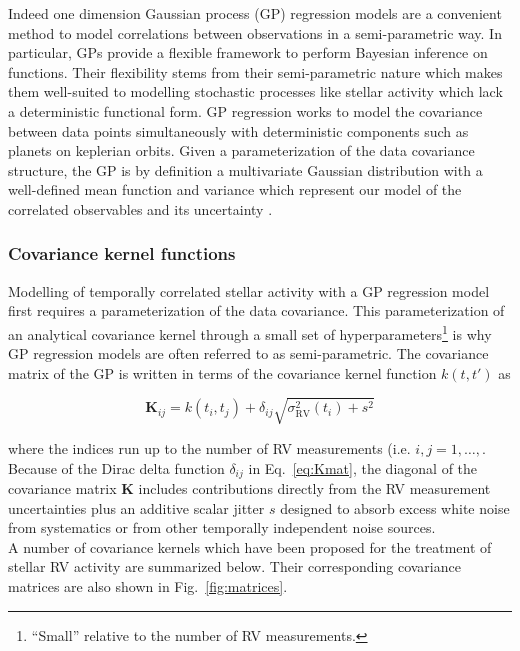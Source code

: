 Indeed one dimension Gaussian process (GP) regression models are a convenient method to model
correlations between observations in a semi-parametric way. In particular, GPs provide a
flexible framework to perform Bayesian inference on functions. Their flexibility stems from
their semi-parametric nature which makes them well-suited to modelling stochastic processes
like stellar activity which lack a deterministic functional form. GP regression works to model
the covariance between data points simultaneously with deterministic components such as planets
on keplerian orbits. Given a parameterization of the data covariance structure, the GP is
by definition a multivariate Gaussian distribution with a well-defined mean function and
variance which represent our model of the correlated observables and its uncertainty
\citep{rasmussen05}. \\

\subsubsection{Covariance kernel functions}
Modelling of temporally correlated stellar activity with a GP regression model first requires
a parameterization of the data covariance. This parameterization of an analytical
covariance kernel through a small set of hyperparameters\footnote{``Small''
  relative to the number of RV measurements.} is why GP regression models are often referred to
as semi-parametric. The covariance matrix of the GP is written in terms of the covariance kernel
function $k(t,t')$ as

\begin{equation}
  \mathbf{K}_{ij} = k(t_i,t_j) + \delta_{ij} \sqrt{\sigma_{\text{RV}}^2(t_i) + s^2} 
\label{eq:Kmat}
\end{equation}

\noindent where the indices run up to the number of RV measurements (i.e. $i,j=1,\dots,$\nrv{)}.
Because of the Dirac delta function $\delta_{ij}$ in Eq.~\ref{eq:Kmat}, the 
diagonal of the covariance matrix $\mathbf{K}$ includes contributions directly from the
RV measurement uncertainties \sigRV{} plus an additive scalar jitter $s$ designed to absorb excess
white noise from systematics or from other temporally independent noise sources. \\

A number of covariance kernels which have been proposed
for the treatment of stellar RV activity are summarized below. Their corresponding covariance
matrices are also shown in Fig.~\ref{fig:matrices}. \\

